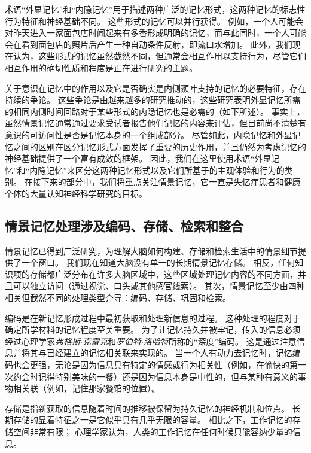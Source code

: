 术语“外显记忆”和“内隐记忆”用于描述两种广泛的记忆形式，这两种记忆的标志性行为特征和神经基础不同。
这些形式的记忆可以并行获得。
例如，一个人可能会对昨天进入一家面包店时闻起来有多香形成明确的记忆，而与此同时，一个人可能会在看到面包店的照片后产生一种自动条件反射，即流口水增加。
此外，我们现在认为，这些形式的记忆虽然截然不同，但通常会相互作用以支持行为，尽管它们相互作用的确切性质和程度是正在进行研究的主题。


关于意识在记忆中的作用以及它是否确实是内侧颞叶支持的记忆的必要特征，存在持续的争论。
这些争论是由越来越多的研究推动的，这些研究表明外显记忆所需的相同内侧时间回路对于某些形式的内隐记忆也是必需的（如下所述）。
事实上，虽然情景记忆通常通过要求受试者报告他们记忆的内容来评估，但目前尚不清楚有意识的可访问性是否是记忆本身的一个组成部分。
尽管如此，内隐记忆和外显记忆之间的区别在区分记忆形式方面发挥了重要的历史作用，并且仍然为考虑记忆的神经基础提供了一个富有成效的框架。
因此，我们在这里使用术语“外显记忆”和“内隐记忆”来区分这两种记忆形式以及它们所基于的主观体验和行为的类别。
在接下来的部分中，我们将重点关注情景记忆，它一直是失忆症患者和健康个体的大量认知神经科学研究的目标。



\subsection{情景记忆处理涉及编码、存储、检索和整合}

情景记忆已得到广泛研究，为理解大脑如何构建、存储和检索生活中的情景细节提供了一个窗口。
我们现在知道大脑没有单一的长期情景记忆存储。
相反，任何知识项的存储都广泛分布在许多大脑区域中，这些区域处理记忆内容的不同方面，并且可以独立访问（通过视觉、口头或其他感官线索）。
其次，情景记忆至少由四种相关但截然不同的处理类型介导：编码、存储、巩固和检索。


编码是在新记忆形成过程中最初获取和处理新信息的过程。
这种处理的程度对于确定所学材料的记忆程度至关重要。
为了让记忆持久并被牢记，传入的信息必须经过心理学家\textit{弗格斯$\cdot$克雷克}和\textit{罗伯特$\cdot$洛哈特}所称的“深度”编码。
这是通过注意信息并将其与已经建立的记忆相关联来实现的。
当一个人有动力去记忆时，记忆编码也会更强，无论是因为信息具有特定的情感或行为相关性（例如，在愉快的第一次约会时记得特别美味的一餐）还是因为信息本身是中性的，但与某种有意义的事物相关联（例如，记住那家餐馆的位置）。


存储是指新获取的信息随着时间的推移被保留为持久记忆的神经机制和位点。
长期存储的显着特征之一是它似乎具有几乎无限的容量。
相比之下，工作记忆的存储空间非常有限；
心理学家认为，人类的工作记忆在任何时候只能容纳少量的信息。


